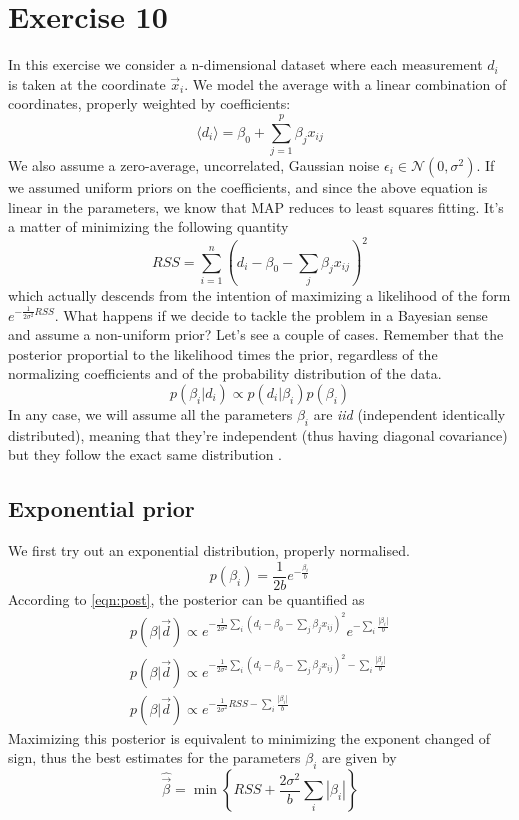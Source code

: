 \documentclass[a4paper,11pt,fleqn]{article}
\begin{document}
\section{Exercise 10}
In this exercise we consider a n-dimensional dataset where each measurement 
$d_i$ is taken at the coordinate $\vec{x}_i$. We model the average with 
a linear combination of coordinates, properly weighted by coefficients:
\begin{equation*}
    \langle d_i \rangle = \beta_0 + \sum_{j=1}^p \beta_j x_{ij}
\end{equation*}
We also assume a zero-average, uncorrelated, Gaussian noise $\epsilon_i \in \mathcal{N}(0,\sigma^2)$.
If we assumed uniform priors on the coefficients, and since the above 
equation is linear in the parameters, we know that MAP reduces to least squares fitting. 
It's a matter of minimizing the following quantity 
\begin{equation}
    RSS = \sum_{i=1}^n (d_i - \beta_0 -\sum_j \beta_j x_{ij})^2
\end{equation}
which actually descends from the intention of maximizing a likelihood of 
the form $e^{-\frac{1}{2\sigma^2}RSS}$.
What happens if we decide to tackle the problem in a Bayesian sense and 
assume a non-uniform prior? Let's see a couple of cases. Remember that 
the posterior proportial to the likelihood times the prior, regardless 
of the normalizing coefficients and of the probability distribution of 
the data.
\begin{equation}
    \label{eqn:post}
    p(\beta_i|d_i) \propto p(d_i|\beta_i)p(\beta_i)
\end{equation}
In any case, we will assume all the parameters $\beta_i$ are \textit{iid} 
(independent identically distributed), meaning that they're independent 
(thus having diagonal covariance) but they follow the exact same 
distribution .



\subsection{Exponential prior}
We first try out an exponential distribution, properly normalised.
\begin{equation}
    p(\beta_i) = \frac{1}{2b}e^{-\frac{\beta_i}{b}}
\end{equation}
According to \ref{eqn:post}, the posterior can be quantified as 
\begin{gather*}
    p(\beta |\vec{d}) \propto e^{-\frac{1}{2\sigma^2}\sum_i (d_i-\beta_0-\sum_j \beta_j x_{ij})^2}e^{-\sum_i \frac{|\beta_i|}{b}} \\
    p(\beta |\vec{d}) \propto e^{-\frac{1}{2\sigma^2}\sum_i (d_i-\beta_0-\sum_j \beta_j x_{ij})^2-\sum_i \frac{|\beta_i|}{b}} \\
    p(\beta |\vec{d}) \propto e^{-\frac{1}{2\sigma^2}RSS-\sum_i \frac{|\beta_i|}{b}}
\end{gather*}
Maximizing this posterior is equivalent to minimizing the exponent changed of 
sign, thus the best estimates for the parameters $\beta_i$ are given by 
\begin{equation}
    \hat{\vec{\beta}} = \min{\left\{RSS + \frac{2\sigma^2}{b}\sum_i|\beta_i|\right\}}
\end{equation}
\end{document}
